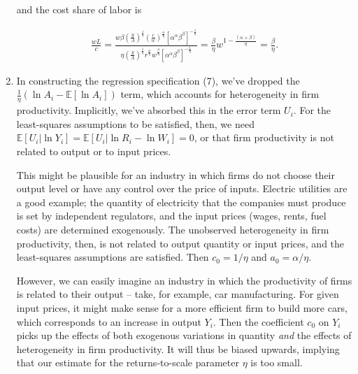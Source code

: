 \documentclass{article}
\begin{document}
\begin{enumerate}
	and the cost share of labor is

	\begin{align*}
	\frac{wL}{c} = \frac{w \beta \left( \frac{y}{A} \right)^{\frac{1}{\eta}} \left( \frac{r}{w} \right)^{\frac{\alpha}{\eta}} [\alpha^\alpha \beta^\beta]^{-\frac{1}{\eta}} }{\eta \left( \frac{y}{A} \right)^{\frac{1}{\eta}} r^{\frac{\alpha}{\eta}} w^{\frac{\beta}{\eta}} [\alpha^\alpha \beta^\beta]^{-\frac{1}{\eta}} } = \frac{\beta}{\eta} w^{1 - \frac{(\alpha + \beta)}{\eta}} = \frac{\beta}{\eta}. 
	\end{align*}

	\item

	In constructing the regression specification (7), we've dropped the $\frac{1}{\eta}( \ln A_i - \mathbb{E}[\ln A_i])$ term, which accounts for heterogeneity in firm productivity. Implicitly, we've absorbed this in the error term $U_i$. For the least-squares assumptions to be satisfied, then, we need $\mathbb{E}[U_i | \ln Y_i] = \mathbb{E}[U_i | \ln R_i - \ln W_i] = 0$, or that firm productivity is not related to output or to input prices.

	This might be plausible for an industry in which firms do not choose their output level or have any control over the price of inputs. Electric utilities are a good example; the quantity of electricity that the companies must produce is set by independent regulators, and the input prices (wages, rents, fuel costs) are determined exogenously. The unobserved heterogeneity in firm productivity, then, is not related to output quantity or input prices, and the least-squares assumptions are satisfied. Then $c_0 = 1/\eta$ and $a_0 = \alpha/\eta$.

	However, we can easily imagine an industry in which the productivity of firms is related to their output -- take, for example, car manufacturing. For given input prices, it might make sense for a more efficient firm to build more cars, which corresponds to an increase in output $Y_i$. Then the coefficient $c_0$ on $Y_i$ picks up the effects of both exogenous variations in quantity \textit{and} the effects of heterogeneity in firm productivity. It will thus be biased upwards, implying that our estimate for the returns-to-scale parameter $\eta$ is too small.

\end{enumerate}
\end{document}
